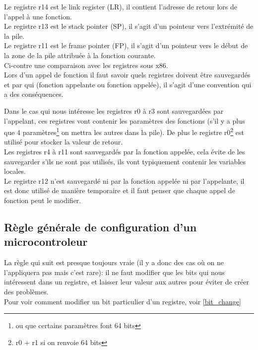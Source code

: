 \documentclass[a4paper,10pt]{article} %
\begin{document}
Le registre r14 est le link register (LR), il contient l'adresse de retour lors de l'appel à une fonction.\\

Le registre r13 est le stack pointer (SP), il s'agit d'un pointeur vers l'extrémité de la pile.\\

Le registre r11 est le frame pointer (FP), il s'agit d'un pointeur vers le début de la zone de la pile attribuée à la fonction courante.\\

Ci-contre une comparaison avec les registres sous x86.\\

Lors d'un appel de fonction il faut savoir quels registres doivent être sauvegardés et par qui (fonction appelante ou fonction appelée), il s'agit d'une convention qui a des conséquences.

Dans le cas qui nous intéresse les registres r0 à r3 sont sauvegardées par l'appelant, ces registres vont contenir les paramètres des fonctions (s'il y a plus que 4 paramètres\footnote{ou que certains paramètres font 64 bits} on mettra les autres dans la pile). De plus le registre r0\footnote{r0 + r1 si on renvoie 64 bits} est utilisé pour stocker la valeur de retour.\\

Les registres r4 à r11 sont sauvegardés par la fonction appelée, cela évite de les sauvegarder s'ils ne sont pas utilisés, ils vont typiquement contenir les variables locales.\\

Le registre r12 n'est sauvegardé ni par la fonction appelée ni par l'appelante, il est donc utilisé de manière temporaire et il faut penser que chaque appel de fonction peut le modifier.

\subsection{\label{rules_config}Règle générale de configuration d'un microcontroleur}
La règle qui suit est presque toujours vraie (il y a donc des cas où on ne l'appliquera pas mais c'est rare): il ne faut modifier que les bits qui nous intéressent dans un registre, et laisser leur valeur aux autres pour éviter de créer des problèmes.\\

Pour voir comment modifier un bit particulier d'un registre, voir \autoref{bit_change} 
\end{document}
